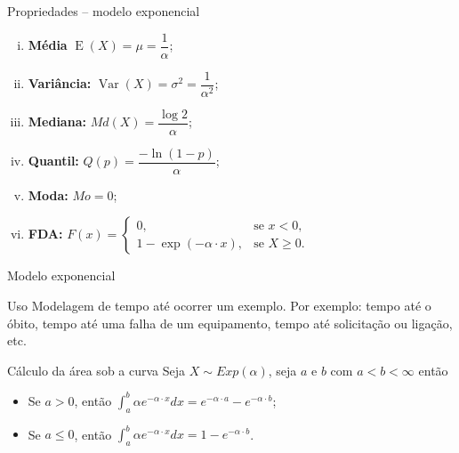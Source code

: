 \documentclass[9pt]{beamer}
\DeclareMathOperator{\espe}{E}
\DeclareMathOperator{\vari}{Var}
\begin{document}
\begin{frame}{Propriedades -- modelo exponencial}
\begin{enumerate}[i.]
 \item \textbf{Média} $\espe(X) = \mu = \dfrac{1}{\alpha}$;
 \vfill
 
 \item \textbf{Variância:} $\vari(X) = \sigma^2 = \dfrac{1}{\alpha^2}$;
 \vfill
 
 \item \textbf{Mediana:} $Md(X) = \dfrac{\log 2}{\alpha}$;
 \vfill
 
 \item \textbf{Quantil:} $Q(p) = \dfrac{-\ln(1-p)}{\alpha}$;
 \vfill
 
 \item \textbf{Moda:} $Mo = 0$;
 \vfill
 
 \item \textbf{FDA:} $F(x) = \begin{cases}
 	0, & \text{se } x < 0,\\
 	1 - \exp(-\alpha \cdot x), & \text{se } X \geq 0.
 \end{cases}$
\end{enumerate}

\end{frame}


\begin{frame}{Modelo exponencial}
 \begin{block}{Uso}
  Modelagem de tempo até ocorrer um exemplo. Por exemplo: tempo até o óbito, tempo até uma falha de um equipamento, tempo até solicitação ou ligação, etc.
 \end{block} 
\vfill
 
 \begin{block}{Cálculo da área sob a curva}
 Seja $X \sim Exp(\alpha)$, seja $a$ e $b$ com $a < b < \infty$ então
  \begin{itemize}
   \item Se $a > 0$, então $\int_{a}^{b} \alpha e^{-\alpha \cdot x} dx = e^{-\alpha\cdot a} - e^{-\alpha\cdot b}$;
   \vfill
   
   \item Se $a \leq 0$, então $\int_{a}^{b} \alpha e^{-\alpha \cdot x} dx = 1 - e^{-\alpha\cdot b}$.
  \end{itemize}

 \end{block}

\end{frame}
\end{document}
